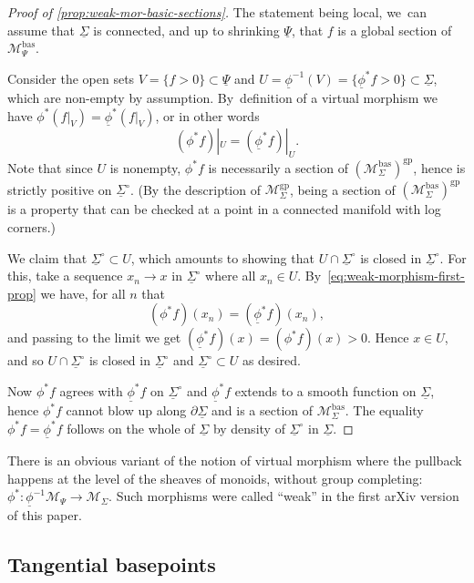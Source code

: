\documentclass[JEP,XML,SOM,Unicode,NoFloatCountersInSection,published]{cedram}
\theoremstyle{definition}
\theoremstyle{remark}
\newenvironment{remark}
  {\pushQED{\qed}\renewcommand{\qedsymbol}{$\lozenge$}\remarkx}
  {\popQED\endremarkx}
\newcommand{\cM}{\mathscr{M}}
\newcommand{\cMgp}{\mathscr{M}^{\mathrm{gp}}}
\newcommand{\cMbas}{\mathscr{M}^{\mathrm{bas}}}
\newcommand{\Sig}{\Sigma}
\newcommand{\uSig}{\underline{\Sigma}}
\newcommand{\uSigo}{\underline{\Sigma}^\circ}
\newcommand{\uphi}{\underline{\phi}}
\newcommand{\uPsi}{\underline{\Psi}}
\begin{document}
\begin{proof}[Proof of \autoref{prop:weak-mor-basic-sections}]
The statement being local, we~can assume that $\uSig$ is connected, and up to shrinking $\uPsi$, that $f$ is a global section of $\cMbas_\Psi$.

Consider the open sets $V=\{f>0\} \subset \uPsi$ and $U=\uphi^{-1}(V)=\{\uphi^*f>0\} \subset \uSig$, which are non-empty by assumption. By~definition of a virtual morphism we have $\phi^*(f|_{V})=\uphi^*(f|_{V})$, or in other words
\begin{equation}\label{eq:weak-morphism-first-prop}
(\phi^*f)|_{U}=(\uphi^*f)|_{U}.
\end{equation}
Note that since $U$ is nonempty, $\phi^*f$ is necessarily a section of $(\cMbas_\Sig)^{\mathrm{gp}}$, hence is strictly positive on $\uSigo$. (By the description of $\cMgp_{\Sig}$, being a section of $(\cMbas_\Sig)^{\mathrm{gp}}$ is a property that can be checked at a point in a connected manifold with log corners.)

We claim that $\uSigo\subset U$, which amounts to showing that $U\cap \uSigo$ is closed in $\uSigo$. For this, take a sequence $x_n\to x$ in $\uSigo$ where all $x_n\in U$. By~\eqref{eq:weak-morphism-first-prop} we have, for all $n$ that
\[
(\phi^*f)(x_n)=(\uphi^*f)(x_n),
\]
and passing to the limit we get $(\uphi^*f)(x)=(\phi^*f)(x) > 0$. Hence $x\in U$, and so $U\cap\uSigo$ is closed in $\uSigo$ and $\uSigo\subset U$ as desired.

Now $\phi^*f$ agrees with $\uphi^*f$ on $\uSigo$ and $\uphi^*f$ extends to a smooth function on $\uSig$, hence $\phi^*f$ cannot blow up along $\partial\uSig$ and is a section of $\cMbas_\Sig$. The equality $\phi^*f=\uphi^*f$ follows on the whole of $\uSig$ by density of $\uSigo$ in $\uSig$.
\end{proof}

\begin{remark}\label{rem:virtual-vs-weak}
There is an obvious variant of the notion of virtual morphism where the pullback happens at the level of the sheaves of monoids, without group completing: $\phi^*:\uphi^{-1}\cM_{\Psi}\to \cM_\Sigma$. Such morphisms were called ``weak'' in the first arXiv version of this paper.
\end{remark}

\subsection{Tangential basepoints}\label{sec:tangential-basepoints}
\end{document}

